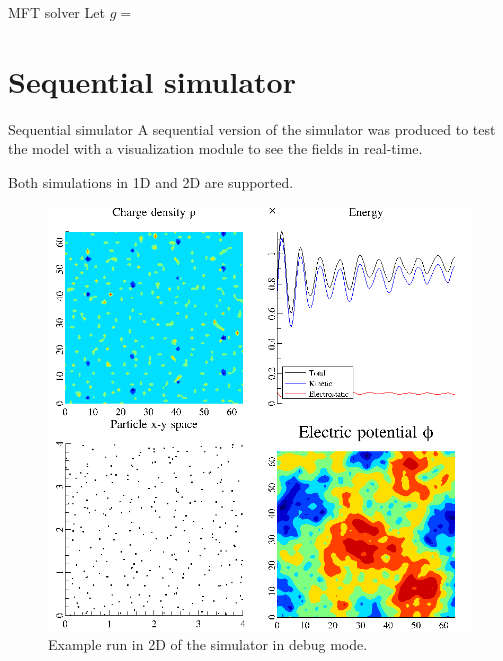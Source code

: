 \documentclass{beamer}
\begin{document}
\begin{frame}{MFT solver}
Let $g = $
\begin{center}%
\end{center}%
\end{frame}

\section{Sequential simulator}


\begin{frame}{Sequential simulator}{}
A sequential version of the simulator was produced to test the model with a 
visualization module to see the fields in real-time.

\vspace{1em}
Both simulations in 1D and 2D are supported.
\end{frame}
\begin{frame}{}{}
\begin{figure}[h]
	\centering
	\includegraphics[height=0.95\textheight]{landau.png}
	\caption{Example run in 2D of the simulator in debug mode.}
	\label{fig:debug-mode}
\end{figure}
\end{frame}
\end{document}
